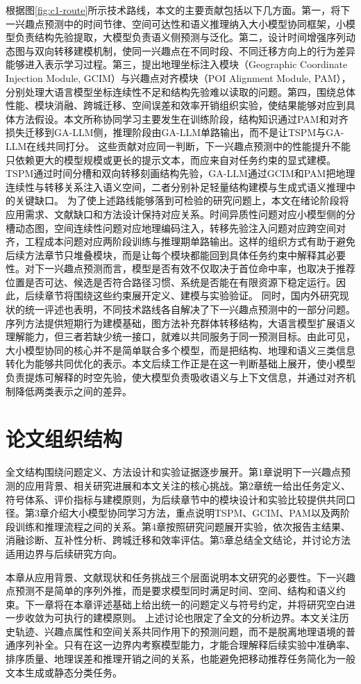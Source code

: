 根据图\ref{fig:c1-route}所示技术路线，本文的主要贡献包括以下几方面。第一，将下一兴趣点预测中的时间节律、空间可达性和语义推理纳入大小模型协同框架，小模型负责结构先验提取，大模型负责语义侧预测与泛化。第二，设计时间增强序列动态图与双向转移建模机制，使同一兴趣点在不同时段、不同迁移方向上的行为差异能够进入表示学习过程。第三，提出地理坐标注入模块（Geographic Coordinate Injection Module, GCIM）与兴趣点对齐模块（POI Alignment Module, PAM），分别处理大语言模型坐标连续性不足和结构先验难以读取的问题。第四，围绕总体性能、模块消融、跨城迁移、空间误差和效率开销组织实验，使结果能够对应到具体方法假设。本文所称协同学习主要发生在训练阶段，结构知识通过PAM和对齐损失迁移到GA-LLM侧，推理阶段由GA-LLM单路输出，而不是让TSPM与GA-LLM在线共同打分。
这些贡献对应同一判断，下一兴趣点预测中的性能提升不能只依赖更大的模型规模或更长的提示文本，而应来自对任务约束的显式建模。TSPM通过时间分槽和双向转移刻画结构先验，GA-LLM通过GCIM和PAM把地理连续性与转移关系注入语义空间，二者分别补足轻量结构建模与生成式语义推理中的关键缺口。
为了使上述路线能够落到可检验的研究问题上，本文在绪论阶段将应用需求、文献缺口和方法设计保持对应关系。时间异质性问题对应小模型侧的分槽动态图，空间连续性问题对应地理编码注入，转移先验注入问题对应跨空间对齐，工程成本问题对应两阶段训练与推理期单路输出。这样的组织方式有助于避免后续方法章节只堆叠模块，而是让每个模块都能回到具体任务约束中解释其必要性。对下一兴趣点预测而言，模型是否有效不仅取决于首位命中率，也取决于推荐位置是否可达、候选是否符合路径习惯、系统是否能在有限资源下稳定运行。因此，后续章节将围绕这些约束展开定义、建模与实验验证。
同时，国内外研究现状的统一评述也表明，不同技术路线各自解决了下一兴趣点预测中的一部分问题。序列方法提供短期行为建模基础，图方法补充群体转移结构，大语言模型扩展语义理解能力，但三者若缺少统一接口，就难以共同服务于同一预测目标。由此可见，大小模型协同的核心并不是简单联合多个模型，而是把结构、地理和语义三类信息转化为能够共同优化的表示。本文后续工作正是在这一判断基础上展开，使小模型负责提炼可解释的时空先验，使大模型负责吸收语义与上下文信息，并通过对齐机制降低两类表示之间的差异。

\section{论文组织结构}
全文结构围绕问题定义、方法设计和实验证据逐步展开。第1章说明下一兴趣点预测的应用背景、相关研究进展和本文关注的核心挑战。第2章统一给出任务定义、符号体系、评价指标与建模原则，为后续章节中的模块设计和实验比较提供共同口径。第3章介绍大小模型协同学习方法，重点说明TSPM、GCIM、PAM以及两阶段训练和推理流程之间的关系。第4章按照研究问题展开实验，依次报告主结果、消融诊断、互补性分析、跨城迁移和效率评估。第5章总结全文结论，并讨论方法适用边界与后续研究方向。

本章从应用背景、文献现状和任务挑战三个层面说明本文研究的必要性。下一兴趣点预测不是简单的序列外推，而是要求模型同时满足时间、空间、结构和语义约束。下一章将在本章评述基础上给出统一的问题定义与符号约定，并将研究空白进一步收敛为可执行的建模原则。
上述讨论也限定了全文的分析边界。本文关注历史轨迹、兴趣点属性和空间关系共同作用下的预测问题，而不是脱离地理语境的普通序列补全。只有在这一边界内考察模型能力，才能合理解释后续实验中准确率、排序质量、地理误差和推理开销之间的关系，也能避免把移动推荐任务简化为一般文本生成或静态分类任务。
